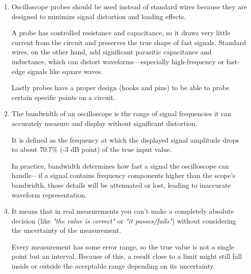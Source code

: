 \documentclass[../main.tex]{subfiles}
\begin{document}
\begin{enumerate}[label=\textbf{\arabic*.}]
	A real probe has resistance and capacitance that can act like a filter, which distorts fast signals (especially square waves) by rounding edges or creating overshoot/undershoot. During compensation, the probe is adjusted using a known reference signal (usually a square wave from the oscilloscope).

	A small adjustable capacitor inside the probe is tuned so that the probe’s RC response matches the oscilloscope’s input RC network. When properly adjusted, the probe no longer \textit{"slows down"} or distorts the signal, so the displayed waveform accurately reflects the true input signal.

	
	\item Oscilloscope probes should be used instead of standard wires because they are designed to minimize signal distortion and loading effects.

	A probe has controlled resistance and capacitance, so it draws very little current from the circuit and preserves the true shape of fast signals. Standard wires, on the other hand, add significant parasitic capacitance and inductance, which can distort waveforms—especially high-frequency or fast-edge signals like square waves.

	Lastly probes have a proper design (hooks and pins) to be able to probe certain specific points on a circuit.
	
	
	\item The bandwidth of an oscilloscope is the range of signal frequencies it can accurately measure and display without significant distortion.

	It is defined as the frequency at which the displayed signal amplitude drops to about 70.7\% (-3 dB point) of the true input value.

	In practice, bandwidth determines how fast a signal the oscilloscope can handle—if a signal contains frequency components higher than the scope’s bandwidth, those details will be attenuated or lost, leading to inaccurate waveform representation.


	\item It means that in real measurements you can’t make a completely absolute decision (like \textit{"the value is correct"} or \textit{"it passes/fails"}) without considering the uncertainty of the measurement.

	Every measurement has some error range, so the true value is not a single point but an interval. Because of this, a result close to a limit might still fall inside or outside the acceptable range depending on its uncertainty.


\end{enumerate}
\end{document}
